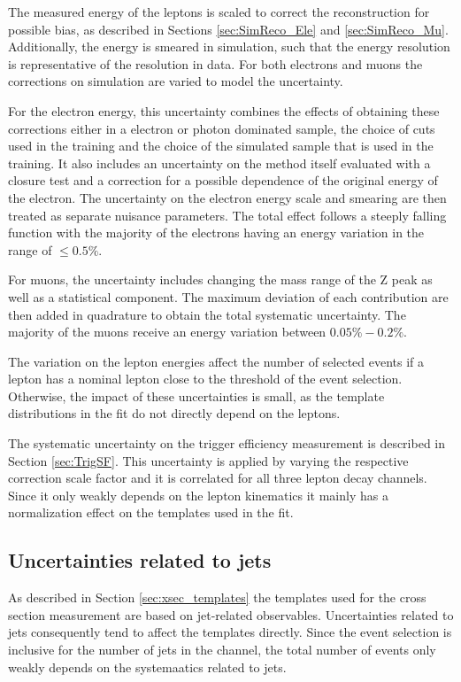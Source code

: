 The measured energy of the leptons is scaled to correct the reconstruction for possible bias, as described in Sections \ref{sec:SimReco_Ele} and \ref{sec:SimReco_Mu}. Additionally, the energy is smeared in simulation, such that the energy resolution is representative of the resolution in data.
For both electrons and muons the corrections on simulation are varied to model the uncertainty.

For the electron energy, this uncertainty combines the effects of obtaining these corrections either in a electron or photon dominated sample, the choice of cuts used in the training and the choice of the simulated sample that is used in the training. It also includes an uncertainty on the method itself evaluated with a closure test and a correction for a possible
dependence of the original energy of the electron.
The uncertainty on the electron energy scale and smearing are then treated as separate nuisance parameters.
The total effect follows a steeply falling function with the majority of the electrons having an energy variation in the range of $\leq 0.5 \%$.

For muons, the uncertainty includes changing the mass range of the Z peak as well as a statistical component. The maximum deviation of each contribution are then added in quadrature to obtain the total systematic uncertainty.
The majority of the muons receive an energy variation between $0.05 \% - 0.2 \%$.

The variation on the lepton energies affect the number of selected events if a lepton has a nominal lepton \pt close to the threshold of the event selection.
Otherwise, the impact of these uncertainties is small, as the template distributions in the fit do not directly depend on the leptons.

The systematic uncertainty on the trigger efficiency measurement is described in Section \ref{sec:TrigSF}. This uncertainty is applied by varying the respective correction scale factor
and it is correlated for all three lepton decay channels. Since it only weakly depends on the lepton kinematics it mainly has a normalization effect on the templates used in the fit.

\subsection{Uncertainties related to jets}

As described in Section \ref{sec:xsec_templates} the templates used for the cross section measurement are based on jet-related observables.
Uncertainties related to jets consequently tend to affect the templates directly. 
Since the event selection is inclusive for the number of jets in the \emu channel, the total number of events only weakly depends on the systemaatics related to jets.

